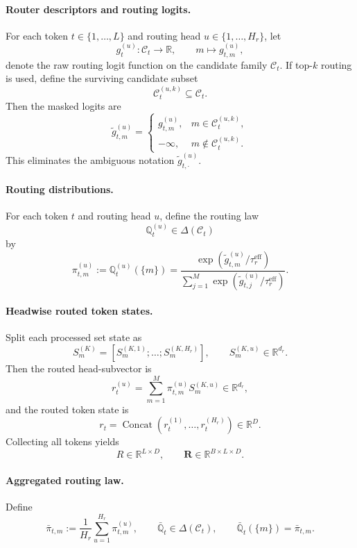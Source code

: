\paragraph{Router descriptors and routing logits.}
For each token \(t\in\{1,\dots,L\}\) and routing head \(u\in\{1,\dots,H_r\}\), let
\[
g_t^{(u)}:\mathcal C_t\to\mathbb R,
\qquad
m\mapsto g_{t,m}^{(u)},
\]
denote the raw routing logit function on the candidate family \(\mathcal C_t\).
If top-\(k\) routing is used, define the surviving candidate subset
\[
\mathcal C_t^{(u,k)}\subseteq \mathcal C_t.
\]
Then the masked logits are
\[
\widetilde g_{t,m}^{(u)}
=
\begin{cases}
g_{t,m}^{(u)},& m\in \mathcal C_t^{(u,k)},\\
-\infty,& m\notin \mathcal C_t^{(u,k)}.
\end{cases}
\]
This eliminates the ambiguous notation \(\widetilde g_{t,\cdot}^{(u)}\).

\paragraph{Routing distributions.}
For each token \(t\) and routing head \(u\), define the routing law
\[
\mathbb Q_t^{(u)}\in\Delta(\mathcal C_t)
\]
by
\[
\pi_{t,m}^{(u)}
:=
\mathbb Q_t^{(u)}(\{m\})
=
\frac{\exp(\widetilde g_{t,m}^{(u)}/\tau_r^{\mathrm{eff}})}
{\sum_{j=1}^{M}\exp(\widetilde g_{t,j}^{(u)}/\tau_r^{\mathrm{eff}})}.
\]

\paragraph{Headwise routed token states.}
Split each processed set state as
\[
S_m^{(K)}
=
[S_m^{(K,1)};\dots;S_m^{(K,H_r)}],
\qquad
S_m^{(K,u)}\in\mathbb R^{d_r}.
\]
Then the routed head-subvector is
\[
r_t^{(u)}
=
\sum_{m=1}^M \pi_{t,m}^{(u)}S_m^{(K,u)}
\in\mathbb R^{d_r},
\]
and the routed token state is
\[
r_t
=
\operatorname{Concat}(r_t^{(1)},\dots,r_t^{(H_r)})
\in\mathbb R^D.
\]
Collecting all tokens yields
\[
R\in\mathbb R^{L\times D},
\qquad
\mathbf R\in\mathbb R^{B\times L\times D}.
\]

\paragraph{Aggregated routing law.}
Define
\[
\bar\pi_{t,m}
:=
\frac{1}{H_r}\sum_{u=1}^{H_r}\pi_{t,m}^{(u)},
\qquad
\bar{\mathbb Q}_t\in \Delta(\mathcal C_t),
\qquad
\bar{\mathbb Q}_t(\{m\})=\bar\pi_{t,m}.
\]

